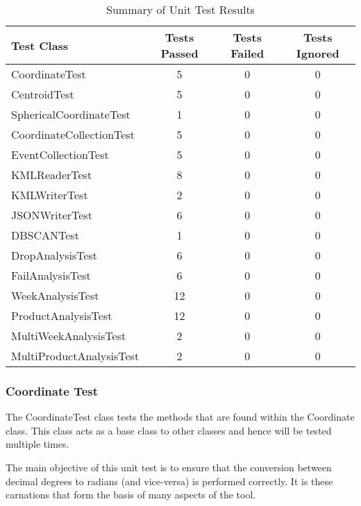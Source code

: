 \begin{table}[h]
  \centering
  \begin{tabular}{|l|c|c|c|}
    \hline
    {\bfseries Test Class}   & {\bfseries Tests Passed} & 
    {\bfseries Tests Failed} & {\bfseries Tests Ignored} \\ 
    \hline
    CoordinateTest           & 5    & 0   & 0   \\ 
    CentroidTest             & 5    & 0   & 0   \\
    SphericalCoordinateTest  & 1    & 0   & 0   \\
    CoordinateCollectionTest & 5    & 0   & 0   \\
    EventCollectionTest      & 5    & 0   & 0   \\    
    KMLReaderTest            & 8    & 0   & 0   \\  
    KMLWriterTest            & 2    & 0   & 0   \\
    JSONWriterTest           & 6    & 0   & 0   \\
    DBSCANTest               & 1    & 0   & 0   \\
    DropAnalysisTest         & 6    & 0   & 0   \\ 
    FailAnalysisTest         & 6    & 0   & 0   \\ 
    WeekAnalysisTest         & 12   & 0   & 0   \\ 
    ProductAnalysisTest      & 12   & 0   & 0   \\ 
    MultiWeekAnalysisTest    & 2    & 0   & 0   \\
    MultiProductAnalysisTest & 2    & 0   & 0   \\
    \hline
  \end{tabular}
  \caption[Summary of Unit Test Results]
          {Summary of Unit Test Results}
  \label{tab:test_class_summary}
\end{table}


\subsubsection{Coordinate Test}

The {\ttfamily CoordinateTest} class tests the methods that are found 
within the Coordinate class. This class acts as a base class to other classes 
and hence will be tested multiple times.

The main objective of this unit test is to ensure that the conversion between 
decimal degrees to radians (and vice-versa) is performed correctly. It is these 
carnations that form the basis of many aspects of the tool.

